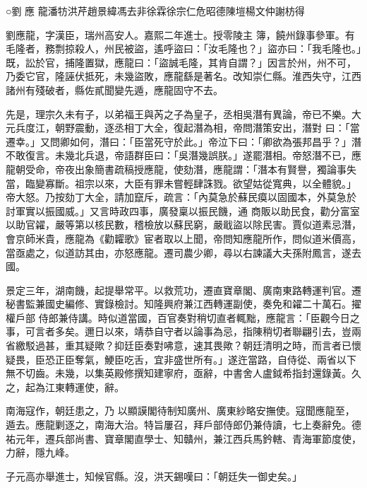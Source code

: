 
\begin{pinyinscope}

 ○劉
 應
 龍潘牥洪芹趙景緯馮去非徐霖徐宗仁危昭德陳塏楊文仲謝枋得



 劉應龍，字漢臣，瑞州高安人。嘉熙二年進士。授零陵主
 簿，饒州錄事參軍。有毛隆者，務剽掠殺人，州民被盜，遙呼盜曰：「汝毛隆也？」盜亦曰：「我毛隆也。」既，訟於官，捕隆置獄，應龍曰：「盜誠毛隆，其肯自謂？」因言於州，州不可，乃委它官，隆誣伏抵死，未幾盜敗，應龍繇是著名。改知崇仁縣。淮西失守，江西諸州有殘破者，縣佐貳聞變先遁，應龍固守不去。



 先是，理宗久未有子，以弟福王與芮之子為皇子，丞相吳潛有異論，帝已不樂。大元兵度江，朝野震動，逐丞相丁大全，復起潛為相，帝問潛策安出，潛對
 曰：「當遷幸。」又問卿如何，潛曰：「臣當死守於此。」帝泣下曰：「卿欲為張邦昌乎？」潛不敢復言。未幾北兵退，帝語群臣曰：「吳潛幾誤朕。」遂罷潛相。帝怒潛不已，應龍朝受命，帝夜出象簡書疏稿授應龍，使劾潛，應龍謂：「潛本有賢譽，獨論事失當，臨變寡斷。祖宗以來，大臣有罪未嘗輕肆誅戮。欲望姑從寬典，以全體貌。」帝大怒。乃按劾丁大全，請加竄斥，疏言：「內莫急於蘇民瘼以固國本，外莫急於討軍實以振國威。」又言時政四事，廣發稟以振民饑，通
 商販以助民食，勸分富室以助官糴，嚴等第以核民數，稽檢放以蘇民窮，嚴戢盜以除民害。賈似道素忌潛，會京師米貴，應龍為《勸糶歌》宦者取以上聞，帝問知應龍所作，問似道米價高，當亟處之，似道訪其由，亦怒應龍。遷司農少卿，尋以右諫議大夫孫附鳳言，遂去國。



 景定三年，湖南饑，起提舉常平。以救荒功，遷直寶章閣、廣南東路轉運判官。遷秘書監兼國史編修、實錄檢討。知隆興府兼江西轉運副使，奏免和糴二十萬石。擢權戶部
 侍郎兼侍講。時似道當國，百官奏對稍切直者輒黜，應龍言：「臣觀今日之事，可言者多矣。邇日以來，靖恭自守者以論事為忌，指陳稍切者聯翩引去，豈兩省繳駁過甚，重其疑歟？抑廷臣奏對咈意，速其畏歟？朝廷清明之時，而言者已懷疑畏，臣恐正臣奪氣，鯁臣吃舌，宜非盛世所有。」遂迕當路，自侍從、兩省以下無不切齒。未幾，以集英殿修撰知建寧府，亟辭，中書舍人盧鉞希指封還錄黃。久之，起為江東轉運使，辭。



 南海寇作，朝廷患之，乃
 以顯謨閣待制知廣州、廣東紗略安撫使。寇聞應龍至，遁去。應龍剿逐之，南海大治。特旨屢召，拜戶部侍郎仍兼侍讀，七上奏辭免。德祐元年，遷兵部尚書、寶章閣直學士、知贛州，兼江西兵馬鈐轄、青海軍節度使，力辭，隱九峰。



 子元高亦舉進士，知候官縣。沒，洪天錫嘆曰：「朝廷失一御史矣。」




\end{pinyinscope}
